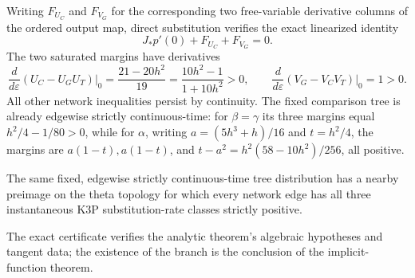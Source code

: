 \documentclass[11pt]{article}
\theoremstyle{remark}\newtheorem{remark}[theorem]{Remark}
\begin{document}
Writing $F_{U_C}$ and $F_{V_G}$ for the corresponding two free-variable derivative columns of the ordered output map, direct substitution verifies the exact linearized identity
\[
J_*p'(0)+F_{U_C}+F_{V_G}=0.
\]
The two saturated margins have derivatives
\[
\frac{d}{d\varepsilon}(U_C-U_GU_T)\bigg|_0
=\frac{21-20h^2}{19}=\frac{10h^2-1}{1+10h^2}>0,
\qquad
\frac{d}{d\varepsilon}(V_G-V_CV_T)\bigg|_0=1>0.
\]
All other network inequalities persist by continuity. The fixed comparison tree is already edgewise strictly continuous-time: for $\beta=\gamma$ its three margins equal $h^2/4-1/80>0$, while for $\alpha$, writing $a=(5h^3+h)/16$ and $t=h^2/4$, the margins are $a(1-t),a(1-t)$, and $t-a^2=h^2(58-10h^2)/256$, all positive.
\begin{corollary}\label{cor:k3p-ct}
The same fixed, edgewise strictly continuous-time tree distribution has a nearby preimage on the theta topology for which every network edge has all three instantaneous K3P substitution-rate classes strictly positive.
\end{corollary}
The exact certificate verifies the analytic theorem's algebraic hypotheses and tangent data; the existence of the branch is the conclusion of the implicit-function theorem.
\end{document}
